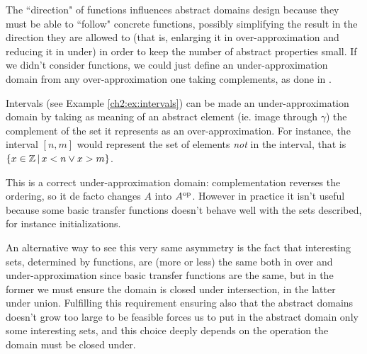 The ``direction" of functions influences abstract domains design because they must be able to ``follow" concrete functions, possibly simplifying the result in the direction they are allowed to (that is, enlarging it in over-approximation and reducing it in under) in order to keep the number of abstract properties small.
If we didn't consider functions, we could just define an under-approximation domain from any over-approximation one taking complements, as done in \cite{lev-backward-analysis-complement}.
\begin{example}
	Intervals (see Example \ref{ch2:ex:intervals}) can be made an under-approximation domain by taking as meaning of an abstract element (ie. image through $\gamma$) the complement of the set it represents as an over-approximation.
	For instance, the interval $[n, m]$ would represent the set of elements \textit{not} in the interval, that is $\{ x \in \mathbb{Z} \,\vert\, x < n \lor x > m \}$.

	This is a correct under-approximation domain: complementation reverses the ordering, so it de facto changes $A$ into $A^{\text{op}}$. However in practice it isn't useful because some basic transfer functions doesn't behave well with the sets described, for instance initializations.
\end{example}

An alternative way to see this very same asymmetry is the fact that interesting sets, determined by functions, are (more or less) the same both in over and under-approximation since basic transfer functions are the same, but in the former we must ensure the domain is closed under intersection, in the latter under union. Fulfilling this requirement ensuring also that the abstract domains doesn't grow too large to be feasible forces us to put in the abstract domain only some interesting sets, and this choice deeply depends on the operation the domain must be closed under.

